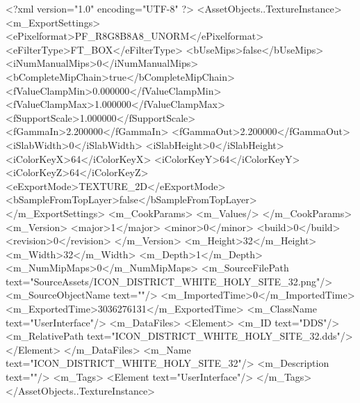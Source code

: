 <?xml version="1.0" encoding="UTF-8" ?>
<AssetObjects..TextureInstance>
	<m_ExportSettings>
		<ePixelformat>PF_R8G8B8A8_UNORM</ePixelformat>
		<eFilterType>FT_BOX</eFilterType>
		<bUseMips>false</bUseMips>
		<iNumManualMips>0</iNumManualMips>
		<bCompleteMipChain>true</bCompleteMipChain>
		<fValueClampMin>0.000000</fValueClampMin>
		<fValueClampMax>1.000000</fValueClampMax>
		<fSupportScale>1.000000</fSupportScale>
		<fGammaIn>2.200000</fGammaIn>
		<fGammaOut>2.200000</fGammaOut>
		<iSlabWidth>0</iSlabWidth>
		<iSlabHeight>0</iSlabHeight>
		<iColorKeyX>64</iColorKeyX>
		<iColorKeyY>64</iColorKeyY>
		<iColorKeyZ>64</iColorKeyZ>
		<eExportMode>TEXTURE_2D</eExportMode>
		<bSampleFromTopLayer>false</bSampleFromTopLayer>
	</m_ExportSettings>
	<m_CookParams>
		<m_Values/>
	</m_CookParams>
	<m_Version>
		<major>1</major>
		<minor>0</minor>
		<build>0</build>
		<revision>0</revision>
	</m_Version>
	<m_Height>32</m_Height>
	<m_Width>32</m_Width>
	<m_Depth>1</m_Depth>
	<m_NumMipMaps>0</m_NumMipMaps>
	<m_SourceFilePath text="SourceAssets/ICON_DISTRICT_WHITE_HOLY_SITE_32.png"/>
	<m_SourceObjectName text=""/>
	<m_ImportedTime>0</m_ImportedTime>
	<m_ExportedTime>3036276131</m_ExportedTime>
	<m_ClassName text="UserInterface"/>
	<m_DataFiles>
		<Element>
			<m_ID text="DDS"/>
			<m_RelativePath text="ICON_DISTRICT_WHITE_HOLY_SITE_32.dds"/>
		</Element>
	</m_DataFiles>
	<m_Name text="ICON_DISTRICT_WHITE_HOLY_SITE_32"/>
	<m_Description text=""/>
	<m_Tags>
		<Element text="UserInterface"/>
	</m_Tags>
</AssetObjects..TextureInstance>

